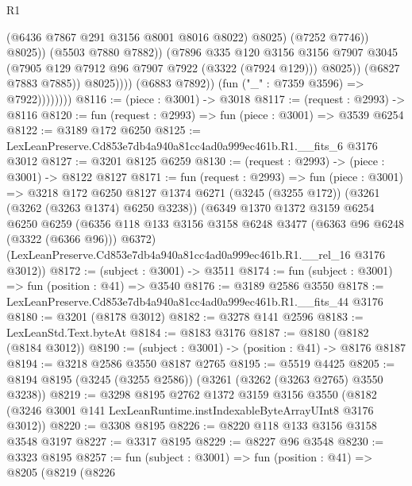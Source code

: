 \begin{lexlean}{R1}
\begin{coremodule}
                                          (@6436 @7867 @291 @3156 @8001 @8016 @8022)
                                          @8025)
                                        (@7252 @7746))
                                      @8025))
                                  (@5503 @7880 @7882))
                                (@7896
                                  @335
                                  @120
                                  @3156
                                  @3156
                                  @7907
                                  @3045
                                  (@7905 @129 @7912 @96 @7907 @7922 (@3322 (@7924 @129)))
                                  @8025))
                              (@6827 @7883 @7885))
                            @8025))))
                    (@6883 @7892))
                  (fun ("_" : @7359 @3596) => @7922))))))))
@8116 := (piece : @3001) -> @3018
@8117 := (request : @2993) -> @8116
@8120 := fun (request : @2993) => fun (piece : @3001) => @3539 @6254
@8122 := @3189 @172 @6250
@8125 := LexLeanPreserve.Cd853e7db4a940a81cc4ad0a999ec461b.R1.__fits_6 @3176 @3012
@8127 := @3201 @8125 @6259
@8130 := (request : @2993) -> (piece : @3001) -> @8122 @8127
@8171 := fun (request : @2993) =>
  fun (piece : @3001) =>
  @3218
    @172
    @6250
    @8127
    @1374
    @6271
    (@3245 (@3255 @172))
    (@3261 (@3262 (@3263 @1374) @6250 @3238))
    (@6349
      @1370
      @1372
      @3159
      @6254
      @6250
      @6259
      (@6356 @118 @133 @3156 @3158 @6248 @3477 (@6363 @96 @6248 (@3322 (@6366 @96))) @6372)
      (LexLeanPreserve.Cd853e7db4a940a81cc4ad0a999ec461b.R1.__rel_16 @3176 @3012))
@8172 := (subject : @3001) -> @3511
@8174 := fun (subject : @3001) => fun (position : @41) => @3540
@8176 := @3189 @2586 @3550
@8178 := LexLeanPreserve.Cd853e7db4a940a81cc4ad0a999ec461b.R1.__fits_44 @3176
@8180 := @3201 (@8178 @3012)
@8182 := @3278 @141 @2596
@8183 := LexLeanStd.Text.byteAt
@8184 := @8183 @3176
@8187 := @8180 (@8182 (@8184 @3012))
@8190 := (subject : @3001) -> (position : @41) -> @8176 @8187
@8194 := @3218 @2586 @3550 @8187 @2765
@8195 := @5519 @4425
@8205 := @8194 @8195 (@3245 (@3255 @2586)) (@3261 (@3262 (@3263 @2765) @3550 @3238))
@8219 := @3298
    @8195
    @2762
    @1372
    @3159
    @3156
    @3550
    (@8182 (@3246 @3001 @141 LexLeanRuntime.instIndexableByteArrayUInt8 @3176 @3012))
@8220 := @3308 @8195
@8226 := @8220 @118 @133 @3156 @3158 @3548 @3197
@8227 := @3317 @8195
@8229 := @8227 @96 @3548
@8230 := @3323 @8195
@8257 := fun (subject : @3001) =>
  fun (position : @41) =>
  @8205
    (@8219
      (@8226

\end{coremodule}
\end{lexlean}
